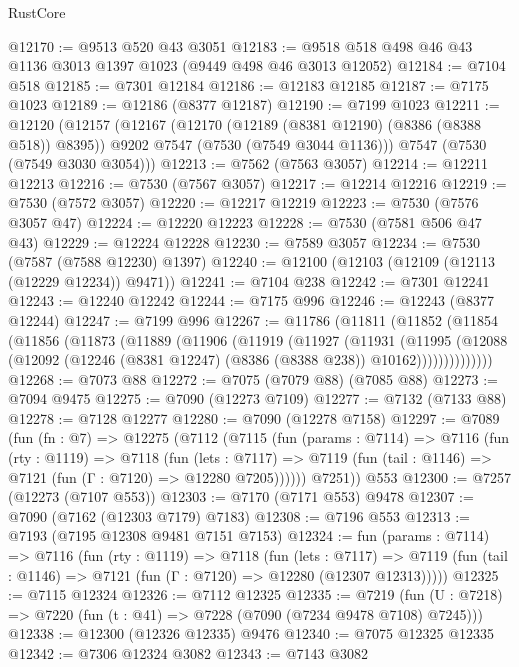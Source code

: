 \begin{lexlean}{RustCore}
\begin{coremodule}
@12170 := @9513 @520 @43 @3051
@12183 := @9518 @518 @498 @46 @43 @1136 @3013 @1397 @1023 (@9449 @498 @46 @3013 @12052)
@12184 := @7104 @518
@12185 := @7301 @12184
@12186 := @12183 @12185
@12187 := @7175 @1023
@12189 := @12186 (@8377 @12187)
@12190 := @7199 @1023
@12211 := @12120
    (@12157
      (@12167
        (@12170 (@12189 (@8381 @12190) (@8386 (@8388 @518)) @8395))
        @9202
        @7547
        (@7530 (@7549 @3044 @1136)))
      @7547
      (@7530 (@7549 @3030 @3054)))
@12213 := @7562 (@7563 @3057)
@12214 := @12211 @12213
@12216 := @7530 (@7567 @3057)
@12217 := @12214 @12216
@12219 := @7530 (@7572 @3057)
@12220 := @12217 @12219
@12223 := @7530 (@7576 @3057 @47)
@12224 := @12220 @12223
@12228 := @7530 (@7581 @506 @47 @43)
@12229 := @12224 @12228
@12230 := @7589 @3057
@12234 := @7530 (@7587 (@7588 @12230) @1397)
@12240 := @12100 (@12103 (@12109 (@12113 (@12229 @12234)) @9471))
@12241 := @7104 @238
@12242 := @7301 @12241
@12243 := @12240 @12242
@12244 := @7175 @996
@12246 := @12243 (@8377 @12244)
@12247 := @7199 @996
@12267 := @11786
    (@11811
      (@11852
        (@11854
          (@11856
            (@11873
              (@11889
                (@11906
                  (@11919
                    (@11927
                      (@11931
                        (@11995
                          (@12088
                            (@12092 (@12246 (@8381 @12247) (@8386 (@8388 @238)) @10162))))))))))))))
@12268 := @7073 @88
@12272 := @7075 (@7079 @88) (@7085 @88)
@12273 := @7094 @9475
@12275 := @7090 (@12273 @7109)
@12277 := @7132 (@7133 @88)
@12278 := @7128 @12277
@12280 := @7090 (@12278 @7158)
@12297 := @7089
    (fun (fn : @7) =>
    @12275
      (@7112
        (@7115
          (fun (params : @7114) =>
          @7116
            (fun (rty : @1119) =>
            @7118
              (fun (lets : @7117) =>
              @7119 (fun (tail : @1146) => @7121 (fun (Γ : @7120) => @12280 @7205))))))
        @7251))
    @553
@12300 := @7257 (@12273 (@7107 @553))
@12303 := @7170 (@7171 @553) @9478
@12307 := @7090 (@7162 (@12303 @7179) @7183)
@12308 := @7196 @553
@12313 := @7193 (@7195 @12308 @9481 @7151 @7153)
@12324 := fun (params : @7114) =>
  @7116
    (fun (rty : @1119) =>
    @7118
      (fun (lets : @7117) =>
      @7119 (fun (tail : @1146) => @7121 (fun (Γ : @7120) => @12280 (@12307 @12313)))))
@12325 := @7115 @12324
@12326 := @7112 @12325
@12335 := @7219
    (fun (U : @7218) => @7220 (fun (t : @41) => @7228 (@7090 (@7234 @9478 @7108) @7245)))
@12338 := @12300 (@12326 @12335) @9476
@12340 := @7075 @12325 @12335
@12342 := @7306 @12324 @3082
@12343 := @7143 @3082

\end{coremodule}
\end{lexlean}
